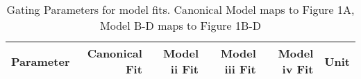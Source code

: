 \documentclass{article}
\begin{document}
	\begin{table}[]
   		\begin{tabular}{l|r|r|r|r|l}
			Parameter & \textbf{Canonical Fit} & Model ii Fit & Model iii Fit & Model iv Fit & Unit \\
			\hline
			
		\end{tabular}
		\caption{Gating Parameters for model fits. Canonical Model maps to Figure 1A, Model B-D maps to Figure 1B-D}
	\end{table}
\end{document}
